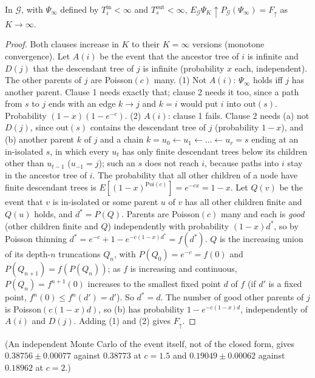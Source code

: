 \begin{proposition}\label{prop:er-tree}
In $\mathcal G$, with $\Psi_\infty$ defined by $T^{\mathrm{in}}_i<\infty$ and
$T^{\mathrm{out}}_s<\infty$, $E_{\mathcal G}\Psi_K\uparrow P_{\mathcal G}(\Psi_\infty)=F_\uparrow$
as $K\to\infty$.
\end{proposition}
\begin{proof}
Both clauses increase in $K$ to their $K=\infty$ versions (monotone convergence).
Let $A(i)$ be the event that the ancestor tree of $i$ is infinite and $D(j)$ that
the descendant tree of $j$ is infinite (probability $x$ each, independent). The
other parents of $j$ are Poisson$(c)$ many.
(1) Not $A(i)$: $\Psi_\infty$ holds iff $j$ has another parent. Clause 1 needs
exactly that; clause 2 needs it too, since a path from $s$ to $j$ ends with an
edge $k\to j$ and $k=i$ would put $i$ into $\mathrm{out}(s)$. Probability
$(1-x)(1-e^{-c})$.
(2) $A(i)$: clause 1 fails. Clause 2 needs (a) not $D(j)$, since
$\mathrm{out}(s)$ contains the descendant tree of $j$ (probability $1-x$), and
(b) another parent $k$ of $j$ and a chain $k=u_0\leftarrow u_1\leftarrow\dots\leftarrow u_r=s$
ending at an in-isolated $s$, in which every $u_t$ has only finite descendant
trees below its children other than $u_{t-1}$ ($u_{-1}=j$); such an $s$ does not
reach $i$, because paths into $i$ stay in the ancestor tree of $i$. The
probability that all other children of a node have finite descendant trees is
$E[(1-x)^{\mathrm{Poi}(c)}]=e^{-cx}=1-x$. Let $Q(v)$ be the event that $v$ is
in-isolated or some parent $u$ of $v$ has all other children finite and $Q(u)$
holds, and $d^*=P(Q)$. Parents are Poisson$(c)$ many and each is \emph{good}
(other children finite and $Q$) independently with probability $(1-x)d^*$, so by
Poisson thinning $d^*=e^{-c}+1-e^{-c(1-x)d^*}=f(d^*)$. $Q$ is the increasing
union of its depth-$n$ truncations $Q_n$, with $P(Q_0)=e^{-c}=f(0)$ and
$P(Q_{n+1})=f(P(Q_n))$; as $f$ is increasing and continuous, $P(Q_n)=f^{n+1}(0)$
increases to the smallest fixed point $d$ of $f$ (if $d'$ is a fixed point,
$f^n(0)\le f^n(d')=d'$). So $d^*=d$. The number of good other parents of $j$ is
Poisson$(c(1-x)d)$, so (b) has probability $1-e^{-c(1-x)d}$, independently of
$A(i)$ and $D(j)$. Adding (1) and (2) gives $F_\uparrow$.
\end{proof}
(An independent Monte Carlo of the event itself, not of the closed form, gives
$0.38756\pm0.00077$ against $0.38773$ at $c=1.5$ and $0.19049\pm0.00062$ against
$0.18962$ at $c=2$.)

